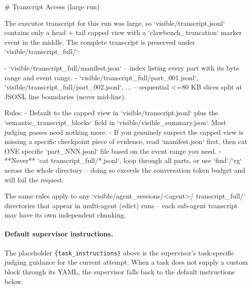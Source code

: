 \begin{clawcode}[title={Transcript chunking note (conditional)},label={lst:c:supervisor:chunk}]
# Transcript Access (large run)

The executor transcript for this run was large, so
`visible/transcript.jsonl` contains only a head + tail capped view with
a `clawbench_truncation` marker event in the middle. The complete
transcript is preserved under `visible/transcript_full/`:

- `visible/transcript_full/manifest.json` -- index listing every part
  with its byte range and event range.
- `visible/transcript_full/part_001.jsonl`,
  `visible/transcript_full/part_002.jsonl`, ... -- sequential <=80 KB
  slices split at JSONL line boundaries (never mid-line).

Rules:
- Default to the capped view in `visible/transcript.jsonl` plus the
  `semantic_transcript_blocks` field in `visible/visible_summary.json`.
  Most judging passes need nothing more.
- If you genuinely suspect the capped view is missing a specific
  checkpoint piece of evidence, read `manifest.json` first, then cat
  ONE specific `part_NNN.jsonl` file based on the event range you need.
- **Never** `cat transcript_full/*.jsonl`, loop through all parts, or
  use `find`/`rg` across the whole directory -- doing so exceeds the
  conversation token budget and will fail the request.

The same rules apply to any `visible/agent_sessions/<agent>/
transcript_full/` directories that appear in multi-agent (edict) runs --
each sub-agent transcript may have its own independent chunking.
\end{clawcode}

\paragraph{Default supervisor instructions.}
The placeholder \texttt{\{task\_instructions\}} above is the
supervisor's task-specific judging guidance for the current attempt.
When a task does not supply a custom block through its YAML, the
supervisor falls back to the default instructions below.

